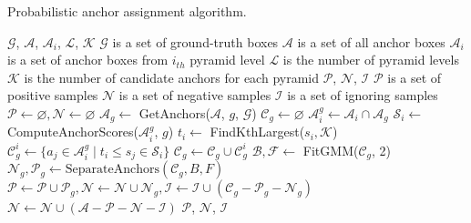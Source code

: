 \documentclass[runningheads]{llncs}
\begin{document}
\begin{algorithm} [tb]
	\caption{Probabilistic anchor assignment algorithm.}
	\label{alg1}
	\begin{algorithmic}[1]
		\REQUIRE $\mathcal{G}$, $\mathcal{A}$, $\mathcal{A}_i$, $\mathcal{L}$, $\mathcal{K}$ \newline $\mathcal{G}$ is a set of ground-truth boxes \newline $\mathcal{A}$ is a set of all anchor boxes \newline $\mathcal{A}_i$ is a set of anchor boxes from $i_{th}$ pyramid level \newline $\mathcal{L}$ is the number of pyramid levels \newline $\mathcal{K}$ is the number of candidate anchors for each pyramid
		\ENSURE $\mathcal{P}$, $\mathcal{N}$, $\mathcal{I}$ \newline $\mathcal{P}$ is a set of positive samples \newline $\mathcal{N}$ is a set of negative samples \newline
		$\mathcal{I}$ is a set of ignoring samples
		\STATE $\mathcal{P} \leftarrow \varnothing, \mathcal{N} \leftarrow \varnothing$
		    \STATE $\mathcal{A}_g \leftarrow$ GetAnchors($\mathcal{A}$, $g$, $\mathcal{G}$) 
		    \STATE $\mathcal{C}_g \leftarrow \varnothing$
    		\STATE $\mathcal{A}_i^g \leftarrow \mathcal{A}_i \cap \mathcal{A}_g$
    		\STATE $\mathcal{S}_i \leftarrow$ ComputeAnchorScores($\mathcal{A}_i^g$, $g$) 
    		\STATE $t_i \leftarrow$ FindKthLargest($s_i, \mathcal{K}$)
    		\STATE $\mathcal{C}_g^i \leftarrow \{ a_{j} \in \mathcal{A}_i^g \mid t_i \leq s_{j} \in \mathcal{S}_i\}$
    		\STATE $\mathcal{C}_g \leftarrow \mathcal{C}_g \cup \mathcal{C}_g^i$
    		\ENDFOR
    	\STATE $\mathcal{B}, \mathcal{F} \leftarrow$ FitGMM($\mathcal{C}_g$, 2) 
    	\STATE $\mathcal{N}_g, \mathcal{P}_g \leftarrow \text{SeparateAnchors}(\mathcal{C}_g, B, F)$ 
    	\STATE $\mathcal{P} \leftarrow \mathcal{P} \cup \mathcal{P}_g, \mathcal{N}\leftarrow \mathcal{N}\cup \mathcal{N}_g, \mathcal{I} \leftarrow \mathcal{I} \cup (\mathcal{C}_g - \mathcal{P}_g-\mathcal{N}_g)$
		\ENDFOR
		\STATE $\mathcal{N} \leftarrow \mathcal{N} \cup (\mathcal{A} - \mathcal{P}-\mathcal{N}-\mathcal{I})$
		\RETURN $\mathcal{P}$, $\mathcal{N}$, $\mathcal{I}$
	\end{algorithmic}
\end{algorithm}
\end{document}
